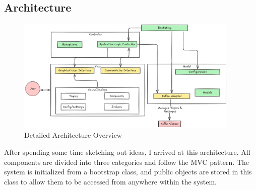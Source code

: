 \documentclass[10pt , a4paper]{report}
\begin{document}
\subsection{Architecture}

\begin{figure}[htpb]
  \begin{center}
    \includegraphics[width=0.95\textwidth]{imgs/ArchitectureDetailed.png}
  \end{center}
  \caption{Detailed Architecture Overview}\label{fig:detailed_arch}
\end{figure}

After spending some time sketching out ideas, I arrived at this architecture. All components are divided into three categories and follow the MVC pattern. The system is initialized from a bootstrap class, and public objects are stored in this class to allow them to be accessed from anywhere within the system.
\end{document}
